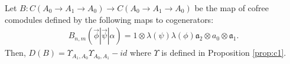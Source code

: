 
\begin{prop}
\label{prop:c2}
Let 
$B:C(A_0 \to A_1 \to A_0)
\longrightarrow C(A_0 \to A_1 \to A_0)$ 
be the map of cofree comodules defined by 
the following maps to cogenerators:
\begin{align*}
B_{n, m} (\vec{\phi} | \vec{\psi} | \alpha) 
= 1 \otimes \lambda(\psi)\lambda(\phi) \mathfrak{a}_2 \otimes a_0 \otimes \mathfrak{a}_1.
\end{align*}
Then, $D(B) = \Upsilon_{A_1,A_0}\Upsilon_{A_0,A_1} - id$ where
$\Upsilon$ is defined in Proposition 
\ref{prop:c1}.
\end{prop}

